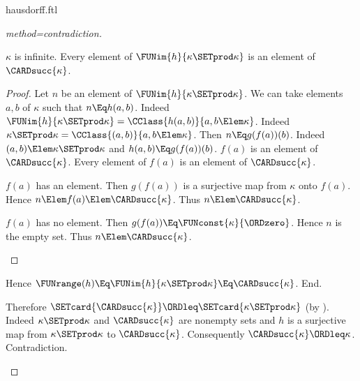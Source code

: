 \documentclass{stex}
\begin{document}
\begin{smodule}{hausdorff.ftl}
\begin{forthel}
\begin{proof}[method=contradiction]
\begin{case}{$\kappa$ is infinite.}
        Every element of $\FUNim{h}{\kappa \SETprod \kappa}$ is an element of $\CARDsucc{\kappa}$.
        \begin{proof}
          Let $n$ be an element of $\FUNim{h}{\kappa \SETprod \kappa}$.
          We can take elements $a, b$ of $\kappa$ such that $n \Eq h(a,b)$.
          Indeed $\FUNim{h}{\kappa \SETprod \kappa} = \CClass{h(a,b)}{a,b \Elem\linebreak \kappa}$.
          Indeed $\kappa \SETprod \kappa = \CClass{(a,b)}{a,b \Elem \kappa}$.
          Then $n \Eq g(f(a))(b)$.
          Indeed $(a,b) \Elem \kappa \SETprod \kappa$ and $h(a,b) \Eq g(f(a))(b)$.
          $f(a)$ is an element of $\CARDsucc{\kappa}$.
          Every element of $f(a)$ is an element of $\CARDsucc{\kappa}$.
  
          \begin{case}{$f(a)$ has an element.}
            Then $g(f(a))$ is a surjective map from $\kappa$ onto $f(a)$.
            Hence $n \Elem f(a) \Elem \CARDsucc{\kappa}$.
            Thus $n \Elem \CARDsucc{\kappa}$.
          \end{case}
  
          \begin{case}{$f(a)$ has no element.}
            Then $g(f(a)) \Eq \FUNconst{\kappa}{\ORDzero}$.
            Hence $n$ is the empty set.
            Thus $n \Elem \CARDsucc{\kappa}$.
          \end{case}
        \end{proof}
  
        Hence $\FUNrange(h) \Eq \FUNim{h}{\kappa \SETprod \kappa} \Eq \CARDsucc{\kappa}$.
      End.
  
      Therefore $\SETcard{\CARDsucc{\kappa}} \ORDleq \SETcard{\kappa \SETprod \kappa}$ (by ).
      Indeed $\kappa \SETprod \kappa$ and $\CARDsucc{\kappa}$ are nonempty sets and $h$ is a surjective map from $\kappa \SETprod \kappa$ to $\CARDsucc{\kappa}$.
      Consequently $\CARDsucc{\kappa} \ORDleq \kappa$.
      Contradiction.
    \end{case}
  \end{proof}
\end{forthel}

\printbibliography
{}
\end{smodule}
\end{document}
